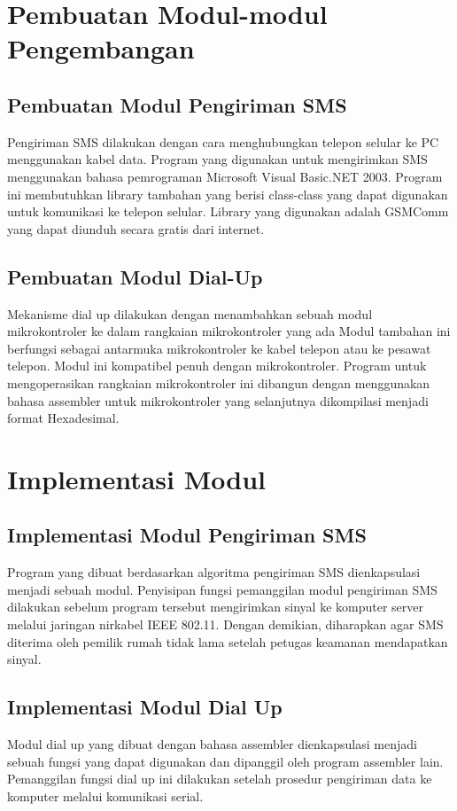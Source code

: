 \documentclass[12pt,a4paper]{article}
\begin{document}
\section{Pembuatan Modul-modul Pengembangan}
\subsection{Pembuatan Modul Pengiriman SMS}
Pengiriman SMS dilakukan dengan cara menghubungkan telepon selular ke PC menggunakan kabel data. 
Program yang digunakan untuk mengirimkan SMS menggunakan bahasa pemrograman Microsoft Visual Basic.NET 2003. Program ini membutuhkan library tambahan yang berisi class-class yang dapat digunakan untuk komunikasi ke telepon selular. Library yang digunakan adalah GSMComm yang dapat diunduh secara gratis dari internet. 
\subsection{Pembuatan Modul Dial-Up}
Mekanisme dial up dilakukan dengan menambahkan sebuah modul mikrokontroler ke dalam rangkaian mikrokontroler yang ada
Modul tambahan ini berfungsi sebagai antarmuka mikrokontroler ke kabel telepon atau ke pesawat telepon. Modul ini kompatibel penuh dengan mikrokontroler. 
Program untuk mengoperasikan rangkaian mikrokontroler ini dibangun dengan menggunakan bahasa assembler untuk mikrokontroler yang selanjutnya dikompilasi menjadi format Hexadesimal.


\section{Implementasi Modul}
\subsection{Implementasi Modul Pengiriman SMS}
Program yang dibuat berdasarkan algoritma pengiriman SMS dienkapsulasi menjadi sebuah modul. Penyisipan fungsi pemanggilan modul pengiriman SMS dilakukan sebelum program tersebut mengirimkan sinyal ke komputer server melalui jaringan nirkabel IEEE 802.11. Dengan demikian, diharapkan agar SMS diterima oleh pemilik rumah tidak lama setelah petugas keamanan mendapatkan sinyal. 
\subsection{Implementasi Modul Dial Up}
Modul dial up yang dibuat dengan bahasa assembler dienkapsulasi menjadi sebuah fungsi yang dapat digunakan dan dipanggil oleh program assembler lain. Pemanggilan fungsi dial up ini dilakukan setelah prosedur pengiriman data ke komputer melalui komunikasi serial.
\end{document}
